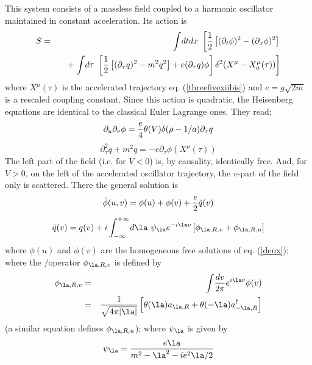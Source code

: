This system consists
of a massless field coupled to
a harmonic oscillator maintained in constant acceleration. Its action is
\begin{eqnarray}
S &=&\int\! dt dx\ \left[ {1 \over 2} \left[ ( \partial_t \phi)^2
- ( \partial_x \phi)^2  \right] \right.
\nonumber\\
&&\quad + \left.
 \int\! d\tau\   \left[ { 1 \over 2} \left[ ( \partial_{ \tau} q)^2 - m ^2
q^2  \right] + e( \partial_{ \tau} q)  \phi  \right]
\delta ^2 (X^{\mu } -X^{\mu
}_a (\tau ))\right]
\label{un}
\end{eqnarray}
where $X^{\mu } (\tau )$ is the accelerated trajectory
eq. (\ref{threefivexiibis}) and $e= g \sqrt{2 m}$ is a rescaled coupling
constant. Since this action is quadratic, the Heisenberg equations are
identical to the classical Euler Lagrange ones. They read:
\begin{equation}
 \partial_u  \partial_v  \phi = {e \over 4 } \theta(V) \delta
( \rho - 1/a)  \partial_{ \tau} q
\label{deux}
\end{equation}
\begin{equation}
\partial_{ \tau} ^2 q +  m ^2
q = - e \partial_{ \tau}  \phi(X^{\mu } (\tau ))
\label{trois}
\end{equation}
The left part of the field (i.e. for $V<0$)
is, by causality, identically free.
And, for $V>0$, on the left of the
accelerated oscillator trajectory, the $v$-part of the field only is
scattered. There the general solution is
\begin{equation}
\tilde \phi (u,v) = \phi (u) + \phi (v) + {e\over 2 } \tilde q(v)
\label{quatre}
\end{equation}
\begin{equation}
\tilde q(v)= q(v) + i  \int _{-\infty}^{+\infty} \! d\la\
 \psi_{ \la} e^{-i \la v}
 \left[ \phi _{ \la,R,v} + \phi _{ \la,R,u} \right]
\label{cinq}
\end{equation}
where $ \phi (u)$ and $ \phi (v)$ are the
homogeneous free solutions of  eq. (\ref{deux}); where the
/operator $ \phi _{ \la,R,v}$ is defined by
\begin{eqnarray}
 \phi _{ \la,R,v} &=&  \int\! {dv \over 2 \pi } e^{i \la v}  \phi (v)
\nonumber\\ &=& {1  \over \sqrt{4 \pi | \la |}}  \left[ \theta ( \la)
a_{\la,R} +  \theta (- \la) a_{- \la,R}^\dagger  \right]
\label{six}
\end{eqnarray}
(a similar equation defines $ \phi _{ \la,R,u}$);
where $ \psi _{ \la}$ is given by
\begin{equation}
\psi _{ \la} = { e\la \over  m ^2 -  \la ^2 -i e^2  \la /2}
\label{sept}
\end{equation}
